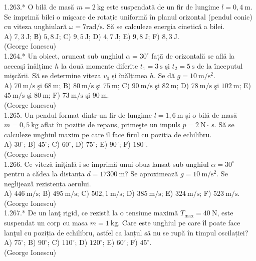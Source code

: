 {1.263.* O bilă de masă $m=2 \mathrm{~kg}$ este suspendată de un fir de lungime $l=0,4 \mathrm{~m}$. Se imprimă bilei o mişcare de rotație uniformă în planul orizontal (pendul conic) cu viteza unghiulară $\omega=7 \mathrm{rad} / \mathrm{s}$. Să se calculeze energia cinetică a bilei.\\ A) $7,3 \mathrm{~J}$; В) $5,8 \mathrm{~J}$; C) $9,5 \mathrm{~J}$; D) $4,7 \mathrm{~J}$; E) $9,8 \mathrm{~J}$; F) $8,3 \mathrm{~J}$.\\ (George Ionescu)\\

1.264.* Un obiect, aruncat sub unghiul $\alpha=30^{\circ}$ fațā de orizontală se află la aceeaşi înălțime $h$ la două momente diferite $t_{1}=3 \mathrm{~s}$ şi $t_{2}=5 \mathrm{~s}$ de la începutul mişcării. Să se determine viteza $v_{0}$ și înălțimea $h$. Se dă $g=10 \mathrm{~m} / \mathrm{s}^{2}$.\\ A) $70 \mathrm{~m} / \mathrm{s}$ şi $68 \mathrm{~m}$; B) $80 \mathrm{~m} / \mathrm{s}$ şi $75 \mathrm{~m}$; C) $90 \mathrm{~m} / \mathrm{s}$ şi $82 \mathrm{~m}$; D) $78 \mathrm{~m} / \mathrm{s}$ şi $102 \mathrm{~m}$; E) $45 \mathrm{~m} / \mathrm{s}$ şi $80 \mathrm{~m}$; F) $73 \mathrm{~m} / \mathrm{s}$ şi $90 \mathrm{~m}$.\\ (George Ionescu)\\

1.265. Un pendul format dintr-un fir de lungime $l=1,6 \mathrm{~m}$ și o bilă de masă $m=0,5 \mathrm{~kg}$ aflat în poziție de repaus, primeşte un impuls $p=2 \mathrm{~N} \cdot \mathrm{~s}$. Să se calculeze unghiul maxim pe care îl face firul cu poziția de echilibru.\\ A) $30^{\circ}$; B) $45^{\circ}$; C) $60^{\circ}$, D) $75^{\circ}$; E) $90^{\circ}$; F) $180^{\circ}$.\\ (George Ionescu)\\

1.266. Ce viteză inițială i se imprimă unui obuz lansat sub unghiul $\alpha=30^{\circ}$ pentru a cădea la distanța $d=17300 \mathrm{~m}$? Se aproximează $g=10 \mathrm{~m} / \mathrm{s}^{2}$. Se neglijează rezistența aerului.\\ A) $446 \mathrm{~m} / \mathrm{s}$; B) $495 \mathrm{~m} / \mathrm{s}$; C) $502,1 \mathrm{~m} / \mathrm{s}$; D) $385 \mathrm{~m} / \mathrm{s}$; E) $324 \mathrm{~m} / \mathrm{s}$; F) $523 \mathrm{~m} / \mathrm{s}$.\\ (George Ionescu)\\

1.267.* De un lanţ rigid, ce rezistă la o tensiune maximă $T_{\max}=40 \mathrm{~N}$, este suspendat un corp cu masa $m=1 \mathrm{~kg}$. Care este unghiul pe care îl poate face lanţul cu poziția de echilibru, astfel ca lanțul să nu se rupă în timpul oscilației?\\ A) $75^{\circ}$; B) $90^{\circ}$; C) $110^{\circ}$; D) $120^{\circ}$; E) $60^{\circ}$; F) $45^{\circ}$.\\ (George Ionescu)\\

}
